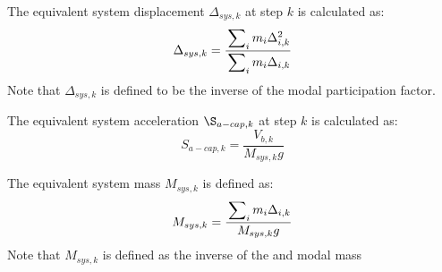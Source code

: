 
The equivalent system displacement $\Delta_{sys,k}$ at step $k$ is calculated as:
\begin{equation}
	\Delta_{sys,k} = \frac{\sideset{}{_i}\sum m_i \Delta_{i,k}^2}{\sideset{}{_i}\sum m_i \Delta_{i,k}}
\end{equation}
Note that $\Delta_{sys,k}$ is defined to be the inverse of the modal participation factor.

The equivalent system acceleration $\S_{a-cap,k}$ at step $k$ is calculated as:
\begin{equation}
	S_{a-cap,k} = \frac{V_{b,k}}{M_{sys,k} g}
\end{equation}

The equivalent system mass $M_{sys,k}$ is defined as:
\begin{equation}
	M_{sys,k} = \frac{\sideset{}{_i}\sum m_i \Delta_{i,k}}{M_{sys,k} g}
\end{equation}
Note that $M_{sys,k}$ is defined as the inverse of the and modal mass
